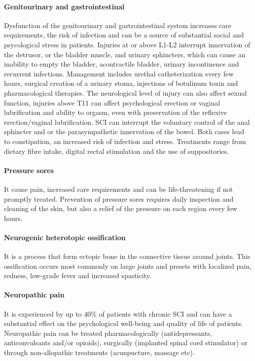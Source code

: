 \documentclass[12pt,article,oneside,a4paper]{memoir}
\begin{document}
\paragraph{Genitourinary and gastrointestinal} Dysfunction of the genitourinary and gastrointestinal system increases care requirements, the risk of infection and can be a source of substantial social and psycological stress in patients. Injuries at or above L1-L2 interrupt innervation of the detrusor, or the bladder muscle, and urinary sphincters, which can cause an inability to empty the bladder, acontractile bladder, urinary incontinence and recurrent infections. Management includes urethal catheterization every few hours, surgical creation of a urinary stoma, injections of botulinum toxin and pharmacological therapies. The neurological level of injury can also affect sexual function, injuries above T11 can affect psychological erection or vaginal lubrification and ability to orgasm, even with preservation of the reflexive erection/vaginal lubrification. SCI can interrupt the voluntary control of the anal sphincter and or the parasympathetic innervation of the bowel. Both cases lead to constipation, an increased risk of infection and stress. Treatments range from dietary fibre intake, digital rectal stimulation and the use of suppositories.

\paragraph{Pressure sores} It cause pain, increased care requirements and can be life-threatening if not promptly treated. Prevention of pressure sores requires daily inspection and cleaning of the skin, but also a relief of the pressure on each region every few hours.

\paragraph{Neurogenic heterotopic ossification} It is a process that form ectopic bone in the connective tissue around joints. This ossification occurs most commonly on large joints and presets with localized pain, redness, low-grade fever and increased spasticity.

\paragraph{Neuropathic pain} It is experienced by up to 40\% of patients with chronic SCI and can have a substantial effect on the psychological well-being and quality of life of patients. Neuropathic pain can be treated pharmacologically (antidepressants, anticonvulsants and/or opioids), surgically (implanted spinal cord stimulator) or through non-allopathic treatments (acunpucture, massage etc).
\end{document}
